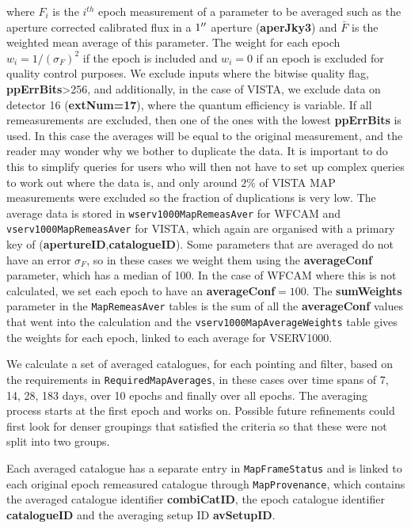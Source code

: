 \documentclass[usenatbib]{mnras}
\begin{document}
    \noindent where $F_i$ is the $i^{th}$ epoch measurement of a parameter to be
    averaged such as the aperture corrected calibrated flux in a $1\hbox{$^{\prime\prime}$}$ aperture
    ({\bf aperJky3}) and $\bar{F}$ is the weighted mean average of this parameter.
    The weight for each epoch $w_i=1/(\sigma_{F})^2$ if the epoch is included and 
    $w_i=0$ if an epoch is excluded for quality control purposes. We exclude inputs
    where the bitwise quality flag, {\bf ppErrBits}>256, and additionally, in the
    case of VISTA, we exclude data on detector 16 ({\bf extNum=17}), where the 
    quantum efficiency is variable. If all remeasurements are excluded, then one  of
    the ones with the lowest {\bf ppErrBits} is used. In this case the averages 
    will be equal to the original measurement, and the reader may wonder why we 
    bother to duplicate the data. It is important to do this to simplify queries 
    for users who will then not have to set up complex queries to work out where 
    the data is, and only around $2\%$ of VISTA MAP measurements were excluded  so
    the fraction of duplications is very low. The average data is stored in 
    \verb+wserv1000MapRemeasAver+ for WFCAM and \verb+vserv1000MapRemeasAver+ for 
    VISTA, which again are organised with a primary key of ({\bf apertureID},{\bf catalogueID}).
    Some parameters that are averaged do not have an error $\sigma_{F}$, so in these
    cases we weight them using the {\bf averageConf} parameter, which has a median
    of 100. In the case of WFCAM where this is not calculated, we set each epoch to
    have an {\bf averageConf}$=100$. The {\bf sumWeights} parameter in the
    \verb+MapRemeasAver+ tables is the sum of all the {\bf averageConf} values that
    went into the calculation and the \verb+vserv1000MapAverageWeights+ table gives
    the weights for each epoch, linked to each average for VSERV1000. 
    
    We calculate a set of averaged catalogues, for each pointing and filter, based
    on the requirements in \verb+RequiredMapAverages+, in these cases over time
    spans of 7, 14, 28, 183 days, over 10 epochs and finally over all epochs. The
    averaging process starts at the first epoch and works on. Possible future
    refinements could first look for denser groupings that satisfied the criteria so
    that these were not split into two groups.
    
    Each averaged catalogue has a separate entry in
    \verb+MapFrameStatus+ and is linked to each original epoch remeasured catalogue
    through \verb+MapProvenance+, which contains the averaged catalogue
    identifier {\bf combiCatID}, the epoch catalogue identifier {\bf catalogueID}
    and the averaging setup ID {\bf avSetupID}. 
    
\end{document}
